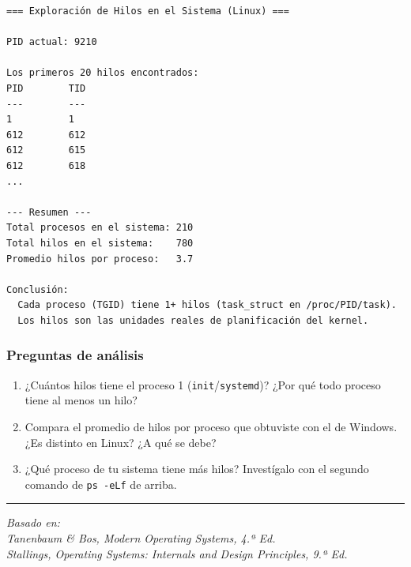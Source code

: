 \documentclass[
  spanish,
]{article}
\providecommand{\tightlist}{%
  \setlength{\itemsep}{0pt}\setlength{\parskip}{0pt}}
\begin{document}
\begin{verbatim}
=== Exploración de Hilos en el Sistema (Linux) ===

PID actual: 9210

Los primeros 20 hilos encontrados:
PID        TID
---        ---
1          1
612        612
612        615
612        618
...

--- Resumen ---
Total procesos en el sistema: 210
Total hilos en el sistema:    780
Promedio hilos por proceso:   3.7

Conclusión:
  Cada proceso (TGID) tiene 1+ hilos (task_struct en /proc/PID/task).
  Los hilos son las unidades reales de planificación del kernel.
\end{verbatim}

\subsubsection{Preguntas de análisis}\label{preguntas-de-anuxe1lisis-5}

\begin{enumerate}
\def\labelenumi{\arabic{enumi}.}
\tightlist
\item
  ¿Cuántos hilos tiene el proceso 1 (\texttt{init}/\texttt{systemd})?
  ¿Por qué todo proceso tiene al menos un hilo?
\item
  Compara el promedio de hilos por proceso que obtuviste con el de
  Windows. ¿Es distinto en Linux? ¿A qué se debe?
\item
  ¿Qué proceso de tu sistema tiene más hilos? Investígalo con el segundo
  comando de \texttt{ps\ -eLf} de arriba.
\end{enumerate}

\begin{center}\rule{0.5\linewidth}{0.5pt}\end{center}

\emph{Basado en:}\\
\emph{Tanenbaum \& Bos, Modern Operating Systems, 4.ª Ed.}\\
\emph{Stallings, Operating Systems: Internals and Design Principles, 9.ª
Ed.}
\end{document}
